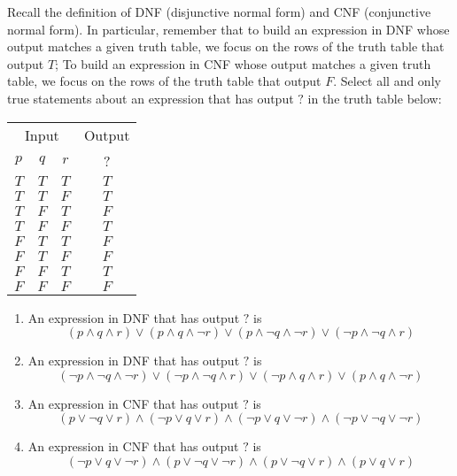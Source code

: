 


Recall the definition of DNF (disjunctive normal form) and CNF (conjunctive normal form).
In particular, remember that to build an expression in DNF whose output matches a given 
truth table, we focus on the rows of the truth table that output $T$; 
To build an expression in CNF whose output matches a given 
truth table, we focus on the rows of the truth table that output $F$.
Select all and only true statements about an expression  that has output $?$ in the truth table below:

\begin{tabular}{ccc||c}
    \multicolumn{3}{c||}{Input}  & Output\\
    $p$ & $q$ & $r$  &  ?\\
    \hline
    $T$ & $T$  & $T$ & $T$ \\
    $T$ & $T$  & $F$ & $T$ \\
    $T$ & $F$  & $T$ & $F$ \\
    $T$ & $F$  & $F$ & $T$ \\
    $F$ & $T$  & $T$ & $F$ \\
    $F$ & $T$  & $F$ & $F$ \\
    $F$ & $F$  & $T$ & $T$ \\
    $F$ & $F$  & $F$ & $F$ \\
\end{tabular}

\begin{enumerate}
\item[] An expression in DNF that has output $?$ is 
$$(p \land q \land r) \lor (p \land q \land \lnot r) \lor (p \land \lnot q \land \lnot r) \lor (\lnot p \land \lnot q \land r)$$
\item[] An expression in DNF that has output $?$ is 
$$(\lnot p \land \lnot q \land \lnot r) \lor (\lnot p \land \lnot q \land r) \lor (\lnot p \land q \land r) \lor (p \land q \land \lnot r)$$
\item[] An expression in CNF that has output $?$ is 
$$(p \lor \lnot q \lor r) \land (\lnot p \lor q \lor r) \land (\lnot p \lor  q \lor \lnot r) \land (\lnot p \lor \lnot q \lor \lnot r)$$
\item[] An expression in CNF that has output $?$ is 
$$(\lnot p \lor  q \lor \lnot r) \land ( p \lor \lnot q \lor \lnot r) \land ( p \lor \lnot q \lor r) \land (p \lor q \lor r)$$
\end{enumerate}
